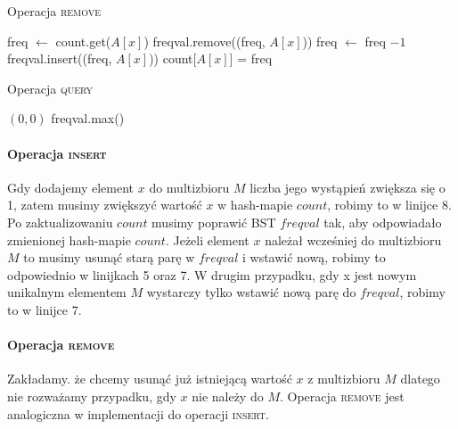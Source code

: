 \hfill
\begin{minipage}[t]{0.47\textwidth}
\begin{algorithm}[H]
    \caption{Operacja \textsc{remove}}
    \label{alg:offline-remove}
    \begin{algorithmic}[1]
            \State freq $\gets$ count.get($A[x]$)
            \State freqval.remove((freq, $A[x]$))
            \State freq $\gets$ freq $ - 1$
                \State freqval.insert((freq, $A[x]$))
            \EndIf
            \State count[$A[x]$] = freq
        \EndFunction
        \vspace{1.2em}
    \end{algorithmic}
\end{algorithm}
\end{minipage}
\begin{algorithm}[H]
    \caption{Operacja \textsc{query}}
    \label{alg:offline-query}
    \begin{algorithmic}[1]
                \State \Return $(0,0)$
            \EndIf
            \Return freqval.max()
        \EndFunction
    \end{algorithmic}
\end{algorithm}

\paragraph{Operacja \textsc{insert}}
Gdy dodajemy element $x$ do multizbioru $M$ liczba jego wystąpień zwiększa się o 1, zatem musimy zwiększyć wartość $x$ w hash-mapie $count$, robimy to w linijce 8. Po zaktualizowaniu $count$ musimy poprawić BST $freqval$ tak, aby odpowiadało zmienionej hash-mapie $count$. Jeżeli element $x$ należał wcześniej do multizbioru $M$ to musimy usunąć starą parę w $freqval$ i wstawić nową, robimy to odpowiednio w linijkach 5 oraz 7. W drugim przypadku, gdy x jest nowym unikalnym elementem $M$ wystarczy tylko wstawić nową parę do $freqval$, robimy to w linijce 7.

\paragraph{Operacja \textsc{remove}}
Zakładamy. że chcemy usunąć już istniejącą wartość $x$ z multizbioru $M$ dlatego nie rozważamy przypadku, gdy $x$ nie należy do $M$. Operacja \textsc{remove} jest analogiczna w implementacji do operacji \textsc{insert}.

